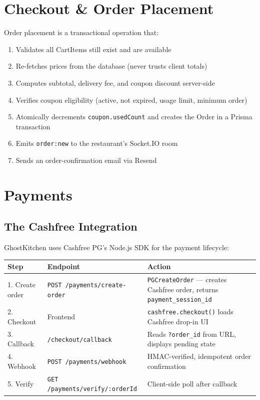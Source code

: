\documentclass[11pt,a4paper,twoside]{book}
\newcommand{\th}[1]{\textbf{\color{white}#1}}
\begin{document}
\section{Checkout \& Order Placement}

Order placement is a transactional operation that:

\begin{enumerate}[leftmargin=1.5em]
  \item Validates all CartItems still exist and are available
  \item Re-fetches prices from the database (never trusts client totals)
  \item Computes subtotal, delivery fee, and coupon discount server-side
  \item Verifies coupon eligibility (active, not expired, usage limit, minimum order)
  \item Atomically decrements \texttt{coupon.usedCount} and creates the Order in a Prisma transaction
  \item Emits \texttt{order:new} to the restaurant's Socket.IO room
  \item Sends an order-confirmation email via Resend
\end{enumerate}

\section{Payments}

\subsection{The Cashfree Integration}

GhostKitchen uses Cashfree PG's Node.js SDK for the payment lifecycle:

\begin{center}\small
\begin{tabular}{llp{7cm}}
\toprule
\rowcolor{headbg}\th{Step} & \th{Endpoint} & \th{Action} \\
\midrule
1. Create order  & \texttt{POST /payments/create-order} & \texttt{PGCreateOrder} — creates Cashfree order, returns \texttt{payment\_session\_id} \\
\rowcolor{rowalt}2. Checkout      & Frontend          & \texttt{cashfree.checkout()} loads Cashfree drop-in UI \\
3. Callback      & \texttt{/checkout/callback} & Reads \texttt{?order\_id} from URL, displays pending state \\
\rowcolor{rowalt}4. Webhook       & \texttt{POST /payments/webhook} & HMAC-verified, idempotent order confirmation \\
5. Verify        & \texttt{GET /payments/verify/:orderId} & Client-side poll after callback \\
\bottomrule
\end{tabular}
\end{center}
\end{document}
